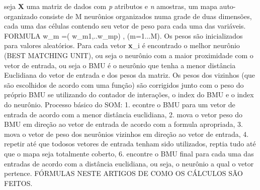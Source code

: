 \cite{kolehmainen2004data} seja \textbf{X} uma matriz de dados com \textit{p} atributos e \textit{n} amostras, um mapa auto-organizado consiste de M neurônios organizados numa grade de duas dimensões, cada uma das células contendo seu vetor de peso para cada uma das variáveis. FORMULA w\_m =( w\_m1,..w\_mp) , (m=1...M). Os pesos são inicializados para valores aleatórios. Para cada vetor \textbf{x}\_i é encontrado o melhor neurônio (BEST MATCHING UNIT), ou seja o neurônio com a maior proximidade com o vetor de entrada, ou seja o BMU é o neurônio que tenha a menor distância Euclidiana do vetor de entrada e dos pesos da matriz. Os pesos dos vizinhos (que são escolhidos de acordo com uma função) são corrigidos junto com o peso do próprio BMU se utilizando do contador de interações, o index do BMU e o index do neurônio. Processo básico do SOM: 1. econtre o BMU para um vetor de entrada de acordo com a menor distância euclidiana, 2. mova o vetor peso do BMU em direção ao vetor de entrada de acordo com a formula apropriada, 3. mova o vetor de peso dos neurônios vizinhos em direção ao vetor de entrada, 4. repetir até que todosos vetores de entrada tenham sido utilizados, reptia tudo até que o mapa seja totalmente coberto, 6. encontre o BMU final para cada uma das entradas de acordo com a distância euclidiana, ou seja, o neurônio a qual o vetor pertence. FÓRMULAS NESTE ARTIGOS DE COMO OS CÁLCULOS SÃO FEITOS.


